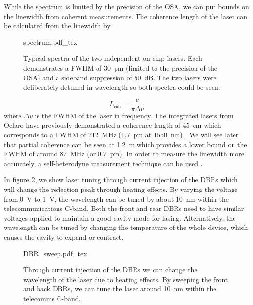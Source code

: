 While the spectrum is limited by the precision of the \ac{OSA}, we can put bounds on the linewidth from coherent measurements. The coherence length of the laser can be calculated from the linewidth by

\begin{figure}[t]
	\centering
	\small
	\def\svgwidth{0.8\textwidth} 
	{spectrum.pdf_tex}
	\caption[On-chip laser spectra]{Typical spectra of the two independent on-chip lasers. Each demonstrates a \ac{FWHM} of \SI{30}{pm} (limited to the precision of the \ac{OSA}) and a sideband suppression of \SI{50}{dB}. The two lasers were deliberately detuned in wavelength so both spectra could be seen.}
	\label{fig:spectra}
\end{figure}

\begin{equation}
	L_\text{coh} = \frac{c}{\pi\Delta v}
\end{equation}
where $\Delta v$ is the \ac{FWHM} of the laser in frequency. The integrated lasers from Oclaro have previously demonstrated a coherence length of \SI{45}{cm} which corresponds to a \ac{FWHM} of \SI{212}{MHz} (\SI{1.7}{pm} at \SI{1550}{nm}) \cite{Sibson2017InP}. We will see later that partial coherence can be seen at \SI{1.2}{\m} which provides a lower bound on the \ac{FWHM} of around \SI{87}{MHz} (or \SI{0.7}{pm}). In order to measure the linewidth more accurately, a self-heterodyne measurement technique can be used \cite{self-heterodyne}. 

In figure \ref{fig:DBR_sweep}, we show laser tuning through current injection of the \acp{DBR} which will change the reflection peak through heating effects. By varying the voltage from \SI{0}{\V} to \SI{1}{\V}, the wavelength can be tuned by about \SI{10}{\nm} within the telecommunications C-band. Both the front and rear \acp{DBR} need to have similar voltages applied to maintain a good cavity mode for lasing. Alternatively, the wavelength can be tuned by changing the temperature of the whole device, which causes the cavity to expand or contract. 

\begin{figure}[tp]
	\centering
	\small
	\def\svgwidth{0.9\textwidth} 
	{DBR_sweep.pdf_tex}
	\caption[Laser wavelength scan with DBR current injection]{Through current injection of the \acp{DBR} we can change the wavelength of the laser due to heating effects. By sweeping the front and back \acp{DBR}, we can tune the laser around \SI{10}{\nm} within the telecomms C-band.}
	\label{fig:DBR_sweep}
\end{figure}

